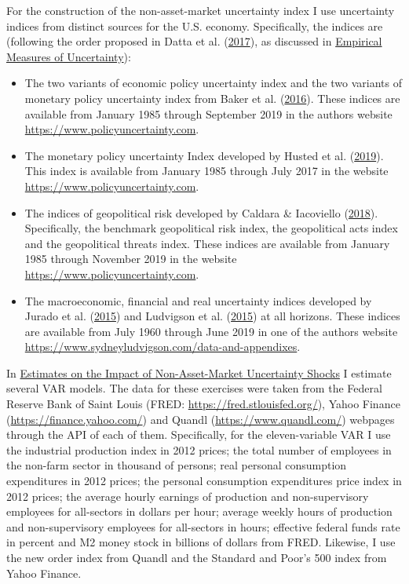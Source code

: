 \documentclass[12pt,twoside]{reedthesis}
\providecommand{\tightlist}{%
  \setlength{\itemsep}{0pt}\setlength{\parskip}{0pt}}
\begin{document}
For the construction of the non-asset-market uncertainty index I use uncertainty indices from distinct sources for the U.S. economy. Specifically, the indices are (following the order proposed in Datta et al. (\protect\hyperlink{ref-dattlondsunbeltferriacojahaligiudroge:2017}{2017}), as discussed in \protect\hyperlink{empirical-measures-of-uncertainty}{Empirical Measures of Uncertainty}):
\begin{itemize}
\tightlist
\item
  The two variants of economic policy uncertainty index and the two variants of monetary policy uncertainty index from Baker et al. (\protect\hyperlink{ref-bakebloodavi:2016}{2016}). These indices are available from January 1985 through September 2019 in the authors website \url{https://www.policyuncertainty.com}.
\item
  The monetary policy uncertainty Index developed by Husted et al. (\protect\hyperlink{ref-hustrogesun:2019}{2019}). This index is available from January 1985 through July 2017 in the website \url{https://www.policyuncertainty.com}.
\item
  The indices of geopolitical risk developed by Caldara \& Iacoviello (\protect\hyperlink{ref-caldiaco:2018}{2018}). Specifically, the benchmark geopolitical risk index, the geopolitical acts index and the geopolitical threats index. These indices are available from January 1985 through November 2019 in the website \url{https://www.policyuncertainty.com}.
\item
  The macroeconomic, financial and real uncertainty indices developed by Jurado et al. (\protect\hyperlink{ref-juraludvng:2015}{2015}) and Ludvigson et al. (\protect\hyperlink{ref-ludvmang:2015}{2015}) at all horizons. These indices are available from July 1960 through June 2019 in one of the authors website \url{https://www.sydneyludvigson.com/data-and-appendixes}.
\end{itemize}
In \protect\hyperlink{estimates-on-the-impact-of-non-asset-market-uncertainty-shocks}{Estimates on the Impact of Non-Asset-Market Uncertainty Shocks} I estimate several VAR models. The data for these exercises were taken from the Federal Reserve Bank of Saint Louis (FRED: \url{https://fred.stlouisfed.org/}), Yahoo Finance (\url{https://finance.yahoo.com/}) and Quandl (\url{https://www.quandl.com/}) webpages through the API of each of them. Specifically, for the eleven-variable VAR I use the industrial production index in 2012 prices; the total number of employees in the non-farm sector in thousand of persons; real personal consumption expenditures in 2012 prices; the personal consumption expenditures price index in 2012 prices; the average hourly earnings of production and non-supervisory employees for all-sectors in dollars per hour; average weekly hours of production and non-supervisory employees for all-sectors in hours; effective federal funds rate in percent and M2 money stock in billions of dollars from FRED. Likewise, I use the new order index from Quandl and the Standard and Poor's 500 index from Yahoo Finance.
\end{document}
